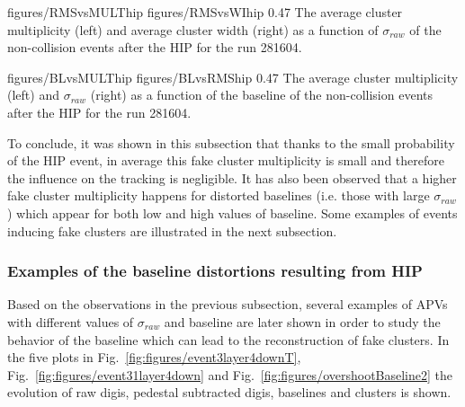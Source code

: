                  {figures/RMSvsMULThip} %
                 {figures/RMSvsWIhip} %
                 {0.47}       %
                 {The average cluster multiplicity (left) and average cluster width (right) as a function of $\sigma_{raw}$ of the non-collision events after the HIP for the run 281604.  } %

                 {figures/BLvsMULThip} %
                 {figures/BLvsRMShip} %
                 {0.47}       %
                 { The average cluster multiplicity (left) and $\sigma_{raw}$ (right) as a function of the baseline  of the non-collision events after the HIP for the run 281604. } %




To conclude, it was shown in this subsection that thanks to the small probability of the HIP event, in average this fake cluster multiplicity is small and therefore the influence on the tracking is negligible. It has also been observed that a higher fake cluster multiplicity happens for distorted baselines (i.e. those with large $\sigma_{raw}$) which appear for both low and high values of baseline. Some examples of events inducing fake clusters are illustrated in the next subsection.


\subsubsection{Examples of the baseline distortions resulting from HIP~\label{sec:distortion}}

Based on the observations in the previous subsection, several examples of APVs with different values of $\sigma_{raw}$ and baseline are later shown in order to study the behavior of the baseline which can lead to the reconstruction of fake clusters. In the five plots in Fig.~\ref{fig:figures/event3layer4downT},  Fig.~\ref{fig:figures/event31layer4down} and Fig.~\ref{fig:figures/overshootBaseline2} the evolution of raw digis, pedestal subtracted digis, baselines and clusters is shown. 

